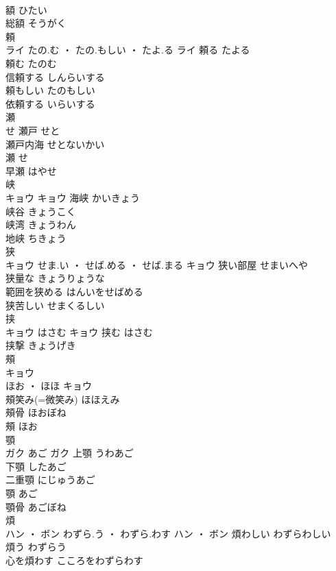 \documentclass[8pt]{extreport}
\begin{document}
\begin{CJK}{UTF8}{min}
\\	額	ひたい	
\\	総額	そうがく	
\\	頼	
\\	ライ	たの.む ・ たの.もしい ・ たよ.る	ライ	頼る	たよる	
\\	頼む	たのむ	
\\	信頼する	しんらいする	
\\	頼もしい	たのもしい	
\\	依頼する	いらいする	
\\	瀬	
\\	せ		瀬戸	せと	
\\	瀬戸内海	せとないかい	
\\	瀬	せ	
\\	早瀬	はやせ	
\\	峡	
\\	キョウ		キョウ	海峡	かいきょう	
\\	峡谷	きょうこく	
\\	峡湾	きょうわん	
\\	地峡	ちきょう	
\\	狭	
\\	キョウ	せま.い ・ せば.める ・ せば.まる	キョウ	狭い部屋	せまいへや	
\\	狭量な	きょうりょうな	
\\	範囲を狭める	はんいをせばめる	
\\	狭苦しい	せまくるしい	
\\	挟	
\\	キョウ	はさむ	キョウ	挟む	はさむ	
\\	挟撃	きょうげき	
\\	頰	
\\	キョウ
\\	ほお ・ ほほ	キョウ
\\	頰笑み(=微笑み)	ほほえみ	
\\	頰骨	ほおぼね	
\\	頰	ほお	
\\	顎	
\\	ガク	あご	ガク	上顎	うわあご	
\\	下顎	したあご	
\\	二重顎	にじゅうあご	
\\	顎	あご	
\\	顎骨	あごぼね	
\\	煩	
\\	ハン ・ ボン	わずら.う ・ わずら.わす	ハン ・ ボン	煩わしい	わずらわしい	
\\	煩う	わずらう	
\\	心を煩わす	こころをわずらわす	

\end{CJK}
\end{document}

